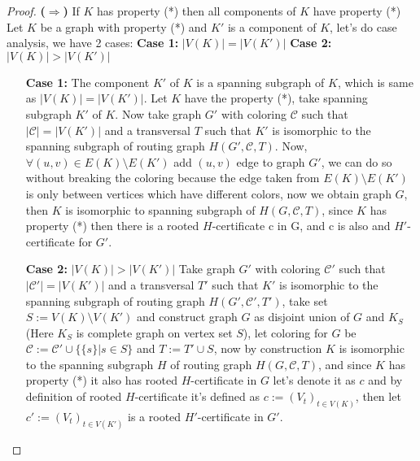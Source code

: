 \begin{proof} 
\label{thm:first}
    \textbf{(\(\Rightarrow\))} If \(K\) has property (*) then all components of $K$ have property (*)
    \newline \newline
    Let $K$ be a graph with property (*) and $K'$ is a component of $K$, let's do case analysis, we have 2 cases: \newline
    \textbf{Case 1:} $|V(K)| = |V(K')|$ \newline
    \textbf{Case 2:} $|V(K)| > |V(K')|$ 
    \begin{itemize}
        \item [\textbf{Case 1:}]
         The component $K'$ of $K$ is a spanning subgraph of $K$, which is same as $|V(K)| = |V(K')|$.
        \newline
        Let $K$ have the property (*), take spanning subgraph $K'$ of $K$.
         Now take graph $G'$ with coloring $\mathcal{C}$ such that $|\mathcal{C}| = |V(K')|$
          and a transversal $T$ such that $K'$ is isomorphic to the spanning subgraph of routing graph $H(G', \mathcal{C}, T)$.
          Now, $\forall (u,v) \in E(K) \setminus E(K')$ add $(u,v)$ edge to graph $G'$, we can do so without breaking the coloring
          because the edge taken from $E(K) \setminus E(K')$ is only between vertices which have different colors, now we obtain graph $G$,
          then $K$ is isomorphic to spanning subgraph of $H(G, \mathcal{C}, T)$, since $K$ has property (*) then there is a rooted 
          $H$-certificate c in G, and c is also and $H'$-certificate for $G'$.
        \item [\textbf{Case 2:}]
        $|V(K)| > |V(K')|$ 
        \newline
        Take graph $G'$ with coloring $\mathcal{C'}$ such that $|\mathcal{C'}| = |V(K')|$
        and a transversal $T'$ such that $K'$ is isomorphic to the spanning subgraph of routing graph $H(G', \mathcal{C'}, T')$,
        take set $S := V(K) \setminus V(K')$ and construct graph $G$ as disjoint union of $G$ and $K_{S}$(Here $K_{S}$ is complete graph on vertex set $S$),
        let coloring for $G$ be $\mathcal{C} := \mathcal{C'} \cup \{\{s\} | s \in S\}$ and $T := T' \cup S $, now by construction $K$ is isomorphic to the spanning subgraph $H$ of routing graph $H(G, \mathcal{C}, T)$,
         and since $K$ has property (*) it also has rooted $H$-certificate in $G$ let's denote it as $c$ and by definition of rooted $H$-certificate it's defined as $c := (V_{t})_{t \in V(K)}$,
         then let $c' := (V_{t})_{t\in V(K')}$ is a rooted $H'$-certificate in $G'$.
        \newline
    \end{itemize}


\end{proof}
